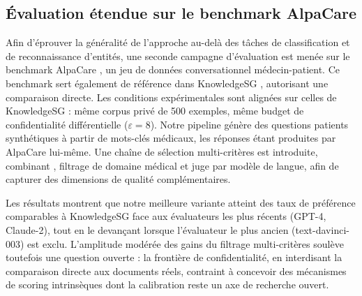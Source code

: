 \subsection{Évaluation étendue sur le benchmark AlpaCare}
\label{subsec:alpacare}

Afin d'éprouver la généralité de l'approche au-delà des tâches de classification et de reconnaissance d'entités, une seconde campagne d'évaluation est menée sur le benchmark AlpaCare \citep{zhang2023alpacare}, un jeu de données conversationnel médecin-patient.
Ce benchmark sert également de référence dans KnowledgeSG \citep{wangKnowledgeSGPrivacyPreservingSynthetic2024}, autorisant une comparaison directe.
Les conditions expérimentales sont alignées sur celles de KnowledgeSG : même corpus privé de \num{500} exemples, même budget de confidentialité différentielle ($\varepsilon = 8$).
Notre pipeline génère des questions patients synthétiques à partir de mots-clés médicaux, les réponses étant produites par AlpaCare lui-même.
Une chaîne de sélection multi-critères est introduite, combinant \score, filtrage de domaine médical et juge par modèle de langue, afin de capturer des dimensions de qualité complémentaires.

Les résultats montrent que notre meilleure variante atteint des taux de préférence comparables à KnowledgeSG face aux évaluateurs les plus récents (GPT-4, Claude-2), tout en le devançant lorsque l'évaluateur le plus ancien (text-davinci-003) est exclu.
L'amplitude modérée des gains du filtrage multi-critères soulève toutefois une question ouverte : la frontière de confidentialité, en interdisant la comparaison directe aux documents réels, contraint à concevoir des mécanismes de scoring intrinsèques dont la calibration reste un axe de recherche ouvert.
